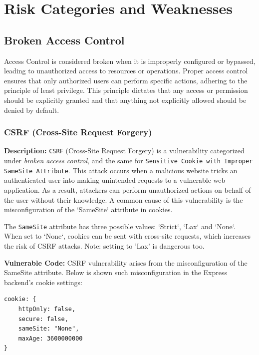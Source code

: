\documentclass[]{article}
\begin{document}
\newpage

\section{Risk Categories and Weaknesses}

\subsection{Broken Access Control}

Access Control is considered broken when it is improperly configured or bypassed, leading to unauthorized access to resources or operations. Proper access control ensures that only authorized users can perform specific actions, adhering to the principle of least privilege. This principle dictates that any access or permission should be explicitly granted and that anything not explicitly allowed should be denied by default.

\subsubsection{CSRF (Cross-Site Request Forgery)}
\label{subsubsec:csrf_with_samesite_none_misconfiguration}
\textbf{Description:}  
\texttt{CSRF} (Cross-Site Request Forgery) is a vulnerability categorized under \textit{broken access control}, and the same for \texttt{Sensitive Cookie with Improper SameSite Attribute}. This attack occurs when a malicious website tricks an authenticated user into making unintended requests to a vulnerable web application. As a result, attackers can perform unauthorized actions on behalf of the user without their knowledge. A common cause of this vulnerability is the misconfiguration of the `SameSite` attribute in cookies.

The \texttt{SameSite} attribute has three possible values: `Strict`, `Lax` and `None`. When set to `None`, cookies can be sent with cross-site requests, which increases the risk of CSRF attacks. Note: setting to 'Lax' is dangerous too.

\textbf{Vulnerable Code:}
CSRF vulnerability arises from the misconfiguration of the SameSite attribute. Below is shown such misconfiguration in the Express backend's cookie settings:

\begin{lstlisting}
cookie: {
    httpOnly: false,
    secure: false,
    sameSite: "None",
    maxAge: 3600000000
}
\end{lstlisting}
\end{document}
